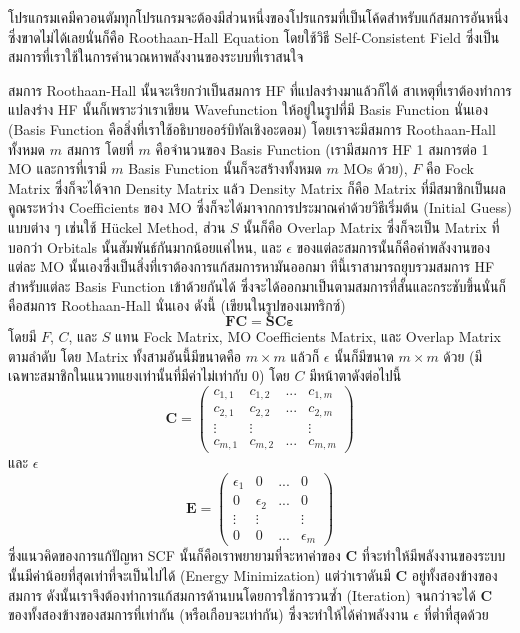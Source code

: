 โปรแกรมเคมีควอนตัมทุกโปรแกรมจะต้องมีส่วนหนึ่งของโปรแกรมที่เป็นโค้ดสำหรับแก้สมการอันหนึ่งซึ่งขาดไม่ได้เลยนั่นก็คือ Roothaan-Hall Equation โดยใช้วิธี Self-Consistent Field ซึ่งเป็นสมการที่เราใช้ในการคำนวณหาพลังงานของระบบที่เราสนใจ

สมการ Roothaan-Hall นั้นจะเรียกว่าเป็นสมการ HF ที่แปลงร่างมาแล้วก็ได้ สาเหตุที่เราต้องทำการแปลงร่าง HF นั้นก็เพราะว่าเราเขียน Wavefunction ให้อยู่ในรูปที่มี Basis Function นั่นเอง (Basis Function คือสิ่งที่เราใช้อธิบายออร์บิทัลเชิงอะตอม) โดยเราจะมีสมการ Roothaan-Hall ทั้งหมด $m$ สมการ โดยที่ $m$ คือจำนวนของ Basis Function (เรามีสมการ HF 1 สมการต่อ 1 MO และการที่เรามี $m$ Basis Function นั้นก็จะสร้างทั้งหมด $m$ MOs ด้วย), $F$ คือ Fock Matrix ซึ่งก็จะได้จาก Density Matrix แล้ว Density Matrix ก็คือ Matrix ที่มีสมาชิกเป็นผลคูณระหว่าง Coefficients ของ MO ซึ่งก็จะได้มาจากการประมาณค่าด้วยวิธีเริ่มต้น (Initial Guess) แบบต่าง ๆ เช่นใช้ H\"{u}ckel Method, ส่วน $S$ นั้นก็คือ Overlap Matrix ซึ่งก็จะเป็น Matrix ที่บอกว่า Orbitals นั้นสัมพันธ์กันมากน้อยแค่ไหน, และ $\epsilon$ ของแต่ละสมการนั้นก็คือค่าพลังงานของแต่ละ MO นั้นเองซึ่งเป็นสิ่งที่เราต้องการแก้สมการหามันออกมา ทีนี้เราสามารถยุบรวมสมการ HF สำหรับแต่ละ Basis Function เข้าด้วยกันได้ ซึ่งจะได้ออกมาเป็นตามสมการที่สั้นและกระชับขึ้นนั่นก็คือสมการ Roothaan-Hall นั่นเอง ดังนี้ (เขียนในรูปของเมทริกซ์)
%
\begin{equation}
  \bm{FC} 
  = 
  \bm{SC \varepsilon}
\end{equation}
%
โดยมี $F$, $C$, และ $S$ แทน Fock Matrix, MO Coefficients Matrix, และ Overlap Matrix ตามลำดับ โดย Matrix ทั้งสามอันนี้มีขนาดคือ $m \times m$ แล้วก็ $\epsilon$ นั้นก็มีขนาด $m \times m$ ด้วย (มีเฉพาะสมาชิกในแนวทแยงเท่านั้นที่มีค่าไม่เท่ากับ 0) โดย $C$ มีหน้าตาดังต่อไปนี้
%
\begin{equation}
  \bm{C}
  =
  \left( \begin{matrix} c_{1,1} & c_{1,2} & ... & c_{1,m} \\
               c_{2,1} & c_{2,2} & ... & c_{2,m} \\
               \vdots  & \vdots  &     & \vdots  \\
               c_{m,1} & c_{m,2} & ... & c_{m,m}
    \end{matrix} \right)
\end{equation}
%
และ $\epsilon$
%
\begin{equation}
  \bm{E}
  =
  \left( \begin{matrix} \epsilon_1 & 0          & ... & 0            \\
               0          & \epsilon_2 & ... & 0            \\
               \vdots     & \vdots     &     & \vdots       \\
               0          & 0          & ... & \epsilon_{m}
    \end{matrix} \right)
\end{equation}
%
ซึ่งแนวคิดของการแก้ปัญหา SCF นั้นก็คือเราพยายามที่จะหาค่าของ $\bm{C}$ ที่จะทำให้มีพลังงานของระบบนั้นมีค่าน้อยที่สุดเท่าที่จะเป็นไปได้ (Energy Minimization) แต่ว่าเราดันมี $\bm{C}$ อยู่ทั้งสองข้างของสมการ ดังนั้นเราจึงต้องทำการแก้สมการด้านบนโดยการใช้การวนซ้ำ (Iteration) จนกว่าจะได้ $\bm{C}$ ของทั้งสองข้างของสมการที่เท่ากัน (หรือเกือบจะเท่ากัน) ซึ่งจะทำให้ได้ค่าพลังงาน $\epsilon$ ที่ต่ำที่สุดด้วย

